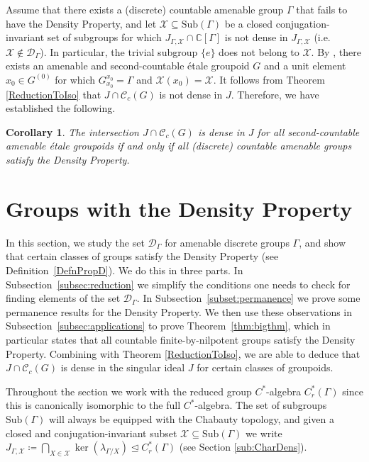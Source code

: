 \documentclass[11pt, oneside, reqno]{amsart}
\newcommand{\Gu}{G^{(0)}}
\newcommand{\cg}{\mathscr{C}_c(G)}
\newtheorem{cor}[thm]{Corollary}
\theoremstyle{definition}
\theoremstyle{remark}
\numberwithin{equation}{section}
\begin{document}
    Assume that there exists a (discrete) countable amenable group $\Gamma$ that fails to have the Density Property, and let $\mathcal{X} \subseteq \text{Sub}(\Gamma)$ be a closed conjugation-invariant set of subgroups for which $J_{\Gamma,\mathcal{X}}\cap\mathbb{C}[\Gamma]$ is not dense in $J_{\Gamma,\mathcal{X}}$ (i.e. $\mathcal{X} \notin \mathcal{D}_\Gamma$). In particular, the trivial subgroup $\{e\}$ does not belong to $\mathcal{X}$. By \cite[Section~6]{Hume}, there exists an amenable and second-countable \'etale groupoid $G$ and a unit element $x_0 \in \Gu$ for which $G^{x_0}_{x_0} = \Gamma$ and $\mathcal{X}(x_0) = \mathcal{X}$. It follows from Theorem \ref{ReductionToIso} that $J \cap \cg$ is not dense in $J$. Therefore, we have established the following.

\begin{cor}
\label{equivalence}
    The intersection $J \cap \cg$ is dense in $J$ for all second-countable amenable \'etale groupoids if and only if all (discrete) countable amenable groups satisfy the Density Property.
\end{cor}

\section{Groups with the Density Property}\label{sec:GrpPropD}
In this section, we study the set $\mathcal{D}_\Gamma$ for amenable discrete groups $\Gamma$, and show that certain classes of groups satisfy the Density Property (see Definition~\ref{DefnPropD}). We do this in three parts. In Subsection~\ref{subsec:reduction} we simplify the conditions one needs to check for finding elements of the set $\mathcal{D}_\Gamma$. In Subsection~\ref{subset:permanence} we prove some permanence results for the Density Property. We then use these observations in Subsection~\ref{subsec:applications} to prove Theorem~\ref{thm:bigthm}, which in particular states that all countable finite-by-nilpotent groups satisfy the Density Property. Combining with Theorem \ref{ReductionToIso}, we are able to deduce that $J \cap \cg$ is dense in the singular ideal $J$ for certain classes of groupoids.

Throughout the section we work with the reduced group $C^*$-algebra $C^*_r(\Gamma)$ since this is canonically isomorphic to the full $C^*$-algebra. The set of subgroups $\text{Sub}(\Gamma)$ will always be equipped with the Chabauty topology, and given a closed and conjugation-invariant subset $\mathcal{X} \subseteq \text{Sub}(\Gamma)$ we write $J_{\Gamma, \mathcal{X}} \coloneq \bigcap_{X \in \mathcal{X}} \ker (\lambda_{\Gamma/X}) \trianglelefteq C^*_r(\Gamma)$ (see Section \ref{sub:CharDens}). 
\end{document}
